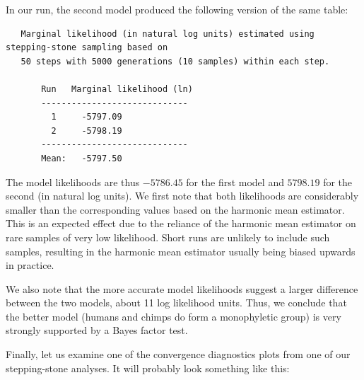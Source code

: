 \documentclass[12pt]{book}
\begin{document}
In our run, the second model produced the following version of the same table:

\scriptsize
\begin{singlespacing}
\begin{verbatim}
   Marginal likelihood (in natural log units) estimated using stepping-stone sampling based on
   50 steps with 5000 generations (10 samples) within each step. 

       Run   Marginal likelihood (ln)
       -----------------------------
         1     -5797.09   
         2     -5798.19   
       -----------------------------
       Mean:   -5797.50
\end{verbatim}
\end{singlespacing}
\normalsize

The model likelihoods are thus $-5786.45$ for the first model and $5798.19$ for the second (in
natural log units).  We first note that both likelihoods are considerably smaller than the
corresponding values based on the harmonic mean estimator. This is an expected effect due to the
reliance of the harmonic mean estimator on rare samples of very low likelihood. Short runs are
unlikely to include such samples, resulting in the harmonic mean estimator usually being biased
upwards in practice.

We also note that the more accurate model likelihoods suggest a larger difference between the two
models, about 11 log likelihood units. Thus, we conclude that the better model (humans and chimps
do form a monophyletic group) is very strongly supported by a Bayes factor test.

Finally, let us examine one of the convergence diagnostics plots from one of our stepping-stone
analyses. It will probably look something like this:
\end{document}
